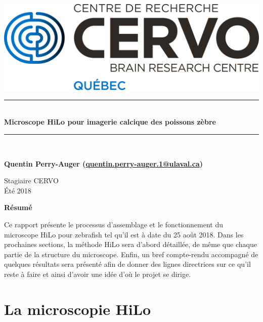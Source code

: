 \documentclass{article}       %
\newcommand{\HRule}{\rule{\linewidth}{0.5mm}}
\begin{document}

\begin{titlepage}  %
\begin{center}   %
\includegraphics[scale=0.5]{fig/logo.png}\\
\vspace{1cm}


\HRule\\[0.4cm]
{\large\bfseries Microscope HiLo pour imagerie calcique des poissons zèbre}
\HRule\\[1.75cm]


\vfill

{\bfseries Quentin Perry-Auger (\url{quentin.perry-auger.1@ulaval.ca})}

\vfill

Stagiaire CERVO\\ Été 2018


\vfill

\end{center}

\textbf{\Large Résumé}

Ce rapport présente le processus d'assemblage et le fonctionnement du microscope HiLo pour zebrafish tel qu'il est à date du 25 août 2018. Dans les prochaines sections, la méthode HiLo sera d'abord détaillée, de même que chaque partie de la structure du microscope. Enfin, un bref compte-rendu accompagné de quelques résultats sera présenté afin de donner des lignes directrices sur ce qu'il reste à faire et ainsi d'avoir une idée d'où le projet se dirige. 

\end{titlepage}



\section{La microscopie HiLo}
\end{document}
